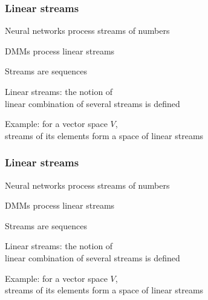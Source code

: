 \documentclass{beamer}
\newcommand{\msgray}[1]{{\color{mygray} #1}}
\begin{document}
\begin{frame}

\frametitle{Linear streams}

\begin{itemize}

\item Neural networks process streams of numbers\\[2ex]

\item DMMs process linear streams\\[2ex]

\item Streams are sequences\\[2ex]

\msgray{\item Linear streams: the notion of\\ linear combination of several streams is defined\\[2ex]

\item Example: for a vector space $V$,\\ streams of its elements form a space of linear streams\\[2ex]


}

\end{itemize}

\end{frame}

\begin{frame}

\frametitle{Linear streams}

\begin{itemize}

\item Neural networks process streams of numbers\\[2ex]

\item DMMs process linear streams\\[2ex]

\item Streams are sequences\\[2ex]

\item Linear streams: the notion of\\ linear combination of several streams is defined\\[2ex]

\msgray{\item Example: for a vector space $V$,\\ streams of its elements form a space of linear streams\\[2ex]


}

\end{itemize}

\end{frame}
\end{document}
